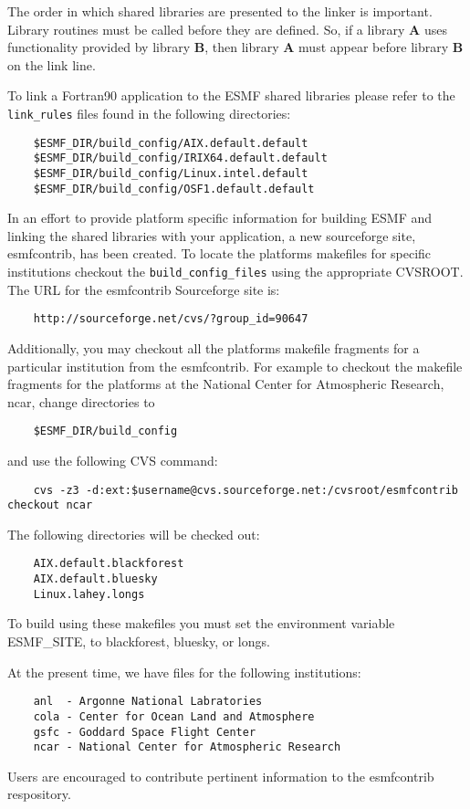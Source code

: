 The order in which shared libraries are presented to 
the linker is important. Library routines must be called before they are 
defined. So, if a library {\bf A} uses functionality provided by library 
{\bf B}, then library {\bf A} must appear before library {\bf B} on the link line. 

To link a Fortran90 application to the ESMF shared libraries please refer to the
{\tt link\_rules} files found in the following directories:


\begin{verbatim}
	$ESMF_DIR/build_config/AIX.default.default
	$ESMF_DIR/build_config/IRIX64.default.default
	$ESMF_DIR/build_config/Linux.intel.default
	$ESMF_DIR/build_config/OSF1.default.default
\end{verbatim}

In an effort to provide platform specific information for building ESMF and linking the
shared libraries with your application, a new sourceforge site, esmfcontrib, has been created.
To locate the platforms makefiles for specific institutions checkout the {\tt build\_config\_files}
using the appropriate CVSROOT.
The URL for the esmfcontrib Sourceforge site is:

\begin{verbatim}
	http://sourceforge.net/cvs/?group_id=90647
\end{verbatim}

Additionally, you may checkout all the platforms makefile fragments for a particular institution
from the esmfcontrib. For example to checkout the makefile fragments for the platforms at the
National Center for Atmospheric Research, ncar, change directories to

\begin{verbatim}
 	$ESMF_DIR/build_config
\end{verbatim}

and use the following CVS command:

\begin{verbatim}
	cvs -z3 -d:ext:$username@cvs.sourceforge.net:/cvsroot/esmfcontrib checkout ncar
\end{verbatim}

The following directories will be checked out:

\begin{verbatim}
	AIX.default.blackforest
	AIX.default.bluesky
	Linux.lahey.longs
\end{verbatim}

To build using these makefiles you must set the environment variable ESMF\_SITE, to blackforest, bluesky, or longs.

At the present time, we have files for the following institutions:

\begin{verbatim}
	anl  - Argonne National Labratories
	cola - Center for Ocean Land and Atmosphere
	gsfc - Goddard Space Flight Center
	ncar - National Center for Atmospheric Research
\end{verbatim}


Users are encouraged to contribute pertinent information to the esmfcontrib respository.




